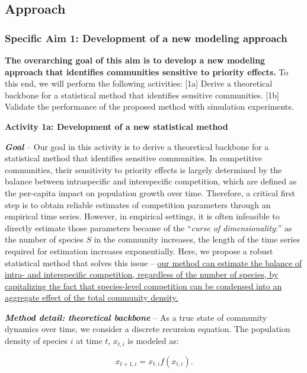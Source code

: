 \documentclass[12pt, class=article, crop=false]{standalone}
\begin{document}
\subsection*{Approach}

\subsubsection*{Specific Aim 1: Development of a new modeling approach}

\textbf{The overarching goal of this aim is to develop a new modeling approach that identifies communities sensitive to priority effects.}
To this end, we will perform the following activities:
[1a] Derive a theoretical backbone for a statistical method that identifies sensitive communities.
[1b] Validate the performance of the proposed method with simulation experiments.

\textbf{Activity 1a: Development of a new statistical method}

\textbf{\textit{Goal}} -- 
Our goal in this activity is to derive a theoretical backbone for a statistical method that identifies sensitive communities.
In competitive communities, their sensitivity to priority effects is largely determined by the balance between intraspecific and interspecific competition, which are defined as the per-capita impact on population growth over time.
Therefore, a critical first step is to obtain reliable estimates of competition parameters through an empirical time series.
However, in empirical settings, it is often infeasible to directly estimate those parameters because of the ``\textit{curse of dimensionality}:'' as the number of species $S$ in the community increases, the length of the time series required for estimation increases exponentially.
Here, we propose a robust statistical method that solves this issue -- \ul{our method can estimate the balance of intra- and interspecific competition, regardless of the number of species, by capitalizing the fact that species-level competition can be condensed into an aggregate effect of the total community density.}

\textbf{\textit{Method detail: theoretical backbone}} -- 
As a true state of community dynamics over time, we consider a discrete recursion equation. The population density of species $i$ at time $t$, $x_{t,i}$ is modeled as:

\begin{equation}
\label{eq:m0}
x_{t + 1, i} = x_{t, i} f(x_{t, i}).
\end{equation}
\end{document}

